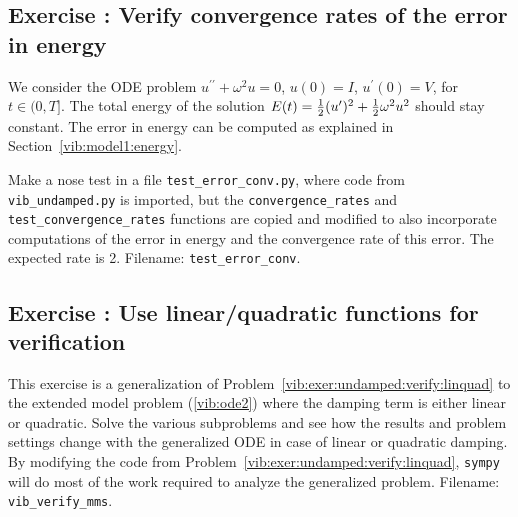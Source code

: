 \documentclass[%
oneside,                 %
final,                   %
10pt]{article}
\newenvironment{doconceexercise}{}{}
\newcounter{doconceexercisecounter}
\begin{document}
\begin{doconceexercise}

\subsection*{Exercise \thedoconceexercisecounter: Verify convergence rates of the error in energy}

\label{vib:exer:energy:convrate}

We consider the ODE problem $u^{\prime\prime} + \omega^2u=0$, $u(0)=I$, $u^{\prime}(0)=V$,
for $t\in (0,T]$. The total energy of the solution
$E(t)=\half(u^{\prime})^2 + \half\omega^2 u^2$ should stay
constant.
The error in energy can be computed as explained in
Section~\ref{vib:model1:energy}.

Make a nose test in a file \Verb!test_error_conv.py!, where code from
\Verb!vib_undamped.py! is imported, but the \Verb!convergence_rates! and
\Verb!test_convergence_rates! functions are copied and modified to also
incorporate computations of the error in energy and the convergence
rate of this error. The expected rate is 2.
\noindent Filename: \Verb!test_error_conv!.

\end{doconceexercise}




\begin{doconceexercise}

\subsection*{Exercise \thedoconceexercisecounter: Use linear/quadratic functions for verification}

\label{vib:exer:verify:gen:linear}

This exercise is a generalization of Problem~\ref{vib:exer:undamped:verify:linquad} to the extended model problem
(\ref{vib:ode2}) where the damping term is either linear or quadratic.
Solve the various subproblems and see how the results and problem
settings change with the generalized ODE in case of linear or
quadratic damping. By modifying the code from Problem~\ref{vib:exer:undamped:verify:linquad}, \texttt{sympy} will do most
of the work required to analyze the generalized problem.
\noindent Filename: \Verb!vib_verify_mms!.

\end{doconceexercise}
\end{document}

